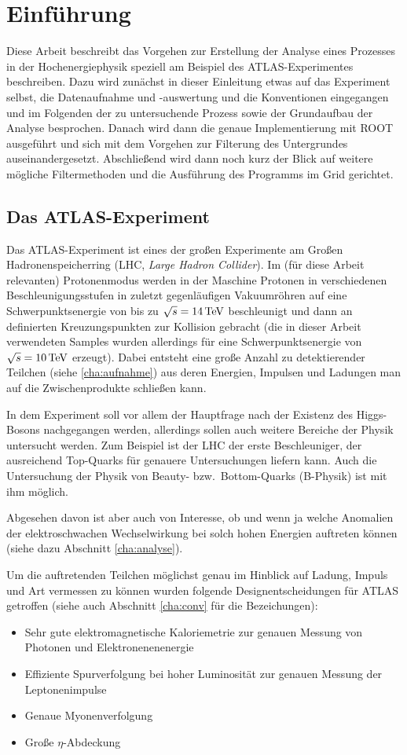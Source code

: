 \section{Einführung}
Diese Arbeit beschreibt das Vorgehen zur Erstellung der Analyse eines Prozesses
in der Hochenergiephysik speziell am Beispiel des ATLAS-Experimentes
beschreiben. Dazu wird zunächst in dieser Einleitung etwas auf das Experiment
selbst, die Datenaufnahme und -auswertung und die Konventionen eingegangen und
im Folgenden der zu untersuchende Prozess sowie der Grundaufbau der Analyse
besprochen.  Danach wird dann die genaue Implementierung mit ROOT ausgeführt und
sich mit dem Vorgehen zur Filterung des Untergrundes auseinandergesetzt.
Abschließend wird dann noch kurz der Blick auf weitere mögliche Filtermethoden
und die Ausführung des Programms im Grid gerichtet.

\subsection{Das ATLAS-Experiment}
Das ATLAS-Experiment ist eines der großen Experimente am Großen
Hadronenspeicherring (LHC, \emph{Large Hadron Collider}). Im (für diese Arbeit
relevanten) Protonenmodus werden in der Maschine Protonen in verschiedenen
Beschleunigungsstufen in zuletzt gegenläufigen Vakuumröhren auf eine
Schwerpunktsenergie von bis zu $\sqrt{s} = \unit[14]{TeV}$ beschleunigt und dann
an definierten Kreuzungspunkten zur Kollision gebracht (die in dieser Arbeit
verwendeten Samples wurden allerdings für eine Schwerpunktsenergie von $\sqrt s
= \unit[10]{TeV}$ erzeugt). Dabei entsteht eine große Anzahl zu detektierender
Teilchen (siehe \ref{cha:aufnahme}) aus deren Energien, Impulsen und Ladungen
man auf die Zwischenprodukte schließen kann.

In dem Experiment soll vor allem der Hauptfrage nach der Existenz des
Higgs-Bosons nachgegangen werden, allerdings sollen auch weitere Bereiche der
Physik untersucht werden. Zum Beispiel ist der LHC der erste Beschleuniger, der
ausreichend Top-Quarks für genauere Untersuchungen liefern kann. Auch die
Untersuchung der Physik von Beauty- bzw.\ Bottom-Quarks (B-Physik) ist mit ihm
möglich.

Abgesehen davon ist aber auch von Interesse, ob und wenn ja welche Anomalien der
elektroschwachen Wechselwirkung bei solch hohen Energien auftreten können (siehe
dazu Abschnitt \ref{cha:analyse}).

Um die auftretenden Teilchen möglichst genau im Hinblick auf Ladung, Impuls und
Art vermessen zu können wurden folgende Designentscheidungen für ATLAS
getroffen\cite{atlas-tp} (siehe auch Abschnitt
\ref{cha:conv} für die Bezeichungen):
\begin{itemize}
  \item Sehr gute elektromagnetische Kaloriemetrie zur genauen Messung von
    Photonen und Elektronenenenergie
  \item Effiziente Spurverfolgung bei hoher Luminosität zur genauen Messung der
    Leptonenimpulse
  \item Genaue Myonenverfolgung
  \item Große $\eta$-Abdeckung 
\end{itemize}

